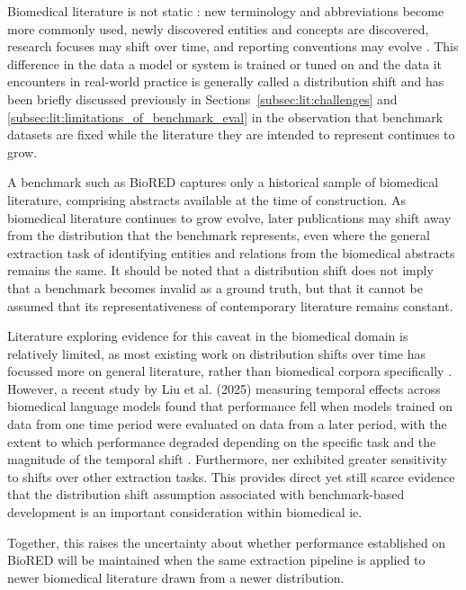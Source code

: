 Biomedical literature is not static \cite{gonzalez2024_biomed_landscape,lu2011_pubmed_publicationrate}: new terminology and abbreviations become more commonly used, newly discovered entities and concepts are discovered, research focuses may shift over time, and reporting conventions may evolve \pref. This difference in the data a model or system is trained or tuned on and the data it encounters in real-world practice is generally called a distribution shift \cite{acevedo2024fairness} and has been briefly discussed previously in Sections~\ref{subsec:lit:challenges} and \ref{subsec:lit:limitations_of_benchmark_eval} in the observation that benchmark datasets are fixed while the literature they are intended to represent continues to grow.

A benchmark such as BioRED captures only a historical sample of biomedical literature, comprising abstracts available at the time of construction. As biomedical literature continues to grow evolve, later publications may shift away from the distribution that the benchmark represents, even where the general extraction task of identifying entities and relations from the biomedical abstracts remains the same. It should be noted that a distribution shift does not imply that a benchmark becomes invalid as a ground truth, but that it cannot be assumed that its representativeness of contemporary literature remains constant.

Literature exploring evidence for this caveat in the biomedical domain is relatively limited, as most existing work on distribution shifts over time has focussed more on general literature, rather than biomedical corpora specifically \pref. However, a recent study by Liu et al. (2025) measuring temporal effects across biomedical language models found that performance fell when models trained on data from one time period were evaluated on data from a later period, with the extent to which performance degraded depending on the specific task and the magnitude of the temporal shift \cite{liu2025time}. Furthermore, \gls{ner} exhibited greater sensitivity to shifts over other extraction tasks. This provides direct yet still scarce evidence that the distribution shift assumption associated with benchmark-based development is an important consideration within biomedical \gls{ie}.

Together, this raises the uncertainty about whether performance established on BioRED will be maintained when the same extraction pipeline is applied to newer biomedical literature drawn from a newer distribution.

